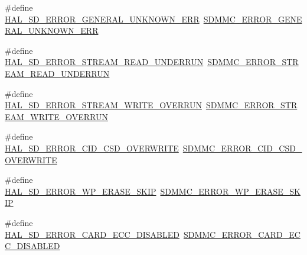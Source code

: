 \begin{DoxyCompactItemize}
\#define \mbox{\hyperlink{group___s_d___exported___constansts___group1_gaa15e0899614c449700690f588b104957}{H\+A\+L\+\_\+\+S\+D\+\_\+\+E\+R\+R\+O\+R\+\_\+\+G\+E\+N\+E\+R\+A\+L\+\_\+\+U\+N\+K\+N\+O\+W\+N\+\_\+\+E\+RR}}~\mbox{\hyperlink{group___s_d_m_m_c___l_l___exported___constants_ga3079b242ec737a24726bc038aaff971f}{S\+D\+M\+M\+C\+\_\+\+E\+R\+R\+O\+R\+\_\+\+G\+E\+N\+E\+R\+A\+L\+\_\+\+U\+N\+K\+N\+O\+W\+N\+\_\+\+E\+RR}}
\item 
\#define \mbox{\hyperlink{group___s_d___exported___constansts___group1_gad2dd699f0250f515e870bfb6ff078d7b}{H\+A\+L\+\_\+\+S\+D\+\_\+\+E\+R\+R\+O\+R\+\_\+\+S\+T\+R\+E\+A\+M\+\_\+\+R\+E\+A\+D\+\_\+\+U\+N\+D\+E\+R\+R\+UN}}~\mbox{\hyperlink{group___s_d_m_m_c___l_l___exported___constants_ga3c0046058cfbc268556f10866b34966f}{S\+D\+M\+M\+C\+\_\+\+E\+R\+R\+O\+R\+\_\+\+S\+T\+R\+E\+A\+M\+\_\+\+R\+E\+A\+D\+\_\+\+U\+N\+D\+E\+R\+R\+UN}}
\item 
\#define \mbox{\hyperlink{group___s_d___exported___constansts___group1_ga01491314d5b6269add32ca3e25fc5c5f}{H\+A\+L\+\_\+\+S\+D\+\_\+\+E\+R\+R\+O\+R\+\_\+\+S\+T\+R\+E\+A\+M\+\_\+\+W\+R\+I\+T\+E\+\_\+\+O\+V\+E\+R\+R\+UN}}~\mbox{\hyperlink{group___s_d_m_m_c___l_l___exported___constants_ga238c7da3692c3d3c3ff4643aa155a156}{S\+D\+M\+M\+C\+\_\+\+E\+R\+R\+O\+R\+\_\+\+S\+T\+R\+E\+A\+M\+\_\+\+W\+R\+I\+T\+E\+\_\+\+O\+V\+E\+R\+R\+UN}}
\item 
\#define \mbox{\hyperlink{group___s_d___exported___constansts___group1_gab9d1f8ed5911462c74b051993c58c3ff}{H\+A\+L\+\_\+\+S\+D\+\_\+\+E\+R\+R\+O\+R\+\_\+\+C\+I\+D\+\_\+\+C\+S\+D\+\_\+\+O\+V\+E\+R\+W\+R\+I\+TE}}~\mbox{\hyperlink{group___s_d_m_m_c___l_l___exported___constants_gac9a9ffbca738f96faaee2ec338a9b96a}{S\+D\+M\+M\+C\+\_\+\+E\+R\+R\+O\+R\+\_\+\+C\+I\+D\+\_\+\+C\+S\+D\+\_\+\+O\+V\+E\+R\+W\+R\+I\+TE}}
\item 
\#define \mbox{\hyperlink{group___s_d___exported___constansts___group1_gab21af51bc5b3b58494ae7aa182d24490}{H\+A\+L\+\_\+\+S\+D\+\_\+\+E\+R\+R\+O\+R\+\_\+\+W\+P\+\_\+\+E\+R\+A\+S\+E\+\_\+\+S\+K\+IP}}~\mbox{\hyperlink{group___s_d_m_m_c___l_l___exported___constants_gaacd0740259204c9afa80cdb6d0dda218}{S\+D\+M\+M\+C\+\_\+\+E\+R\+R\+O\+R\+\_\+\+W\+P\+\_\+\+E\+R\+A\+S\+E\+\_\+\+S\+K\+IP}}
\item 
\#define \mbox{\hyperlink{group___s_d___exported___constansts___group1_ga4c2c40d28d862d81cea272f5d934f6a0}{H\+A\+L\+\_\+\+S\+D\+\_\+\+E\+R\+R\+O\+R\+\_\+\+C\+A\+R\+D\+\_\+\+E\+C\+C\+\_\+\+D\+I\+S\+A\+B\+L\+ED}}~\mbox{\hyperlink{group___s_d_m_m_c___l_l___exported___constants_ga60306ac146417b86487463d354d2a7cb}{S\+D\+M\+M\+C\+\_\+\+E\+R\+R\+O\+R\+\_\+\+C\+A\+R\+D\+\_\+\+E\+C\+C\+\_\+\+D\+I\+S\+A\+B\+L\+ED}}

\end{DoxyCompactItemize}
